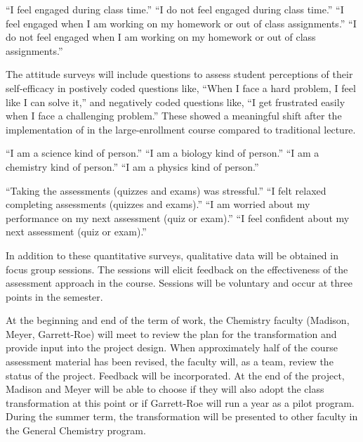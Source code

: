 \documentclass[10pt,letterpaper]{article}
\begin{document}
``I feel engaged during class time.'' ``I do not feel engaged during class time.'' ``I feel engaged when I am working on my homework or out of class assignments.'' ``I do not feel engaged when I am working on my homework or out of class assignments.''


The attitude surveys will include questions to assess student perceptions of their self-efficacy in postively coded questions like, ``When I face a hard problem, I feel like I can solve it,'' and negatively coded questions like, ``I get frustrated easily when I face a challenging problem.'' These showed a meaningful shift after the implementation of \pogil  in the large-enrollment course compared to traditional lecture.

``I am a science kind of person.'' ``I am a biology kind of person.'' ``I am a chemistry kind of person.'' ``I am a physics kind of person.'' 

``Taking the assessments (quizzes and exams) was stressful.'' ``I felt relaxed completing assessments (quizzes and exams).'' ``I am worried about my performance on my next assessment (quiz or exam).'' ``I feel confident about my next assessment (quiz or exam).''

 In addition to these quantitative surveys, qualitative data will be obtained in focus group sessions. The sessions will elicit feedback on the effectiveness of the assessment approach in the course. Sessions will be voluntary and occur at three points in the semester.

At the beginning and end of the term of work, the \pogil Chemistry faculty (Madison, Meyer, Garrett-Roe) will meet to review the plan for the transformation and provide input into the project design. When approximately half of the course assessment material has been revised, the \pogil faculty will, as a team, review the status of the project. Feedback will be incorporated. At the end of the project, Madison and Meyer will be able to choose if they will also adopt the class transformation at this point or if Garrett-Roe will run a year as a pilot program. During the summer term, the transformation will be presented to other faculty in the General Chemistry program.
\end{document}

